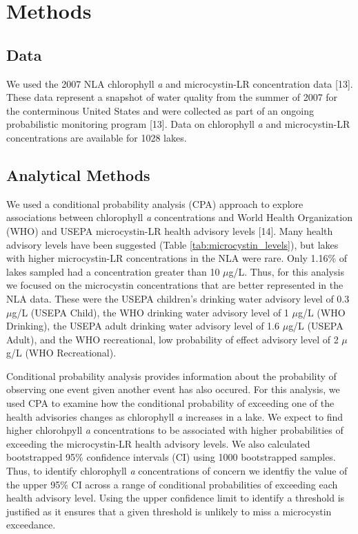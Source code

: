 \documentclass[11pt,]{article}
\begin{document}
\section{Methods}\label{methods}

\subsection{Data}\label{data}

We used the 2007 NLA chlorophyll \emph{a} and microcystin-LR
concentration data {[}13{]}. These data represent a snapshot of water
quality from the summer of 2007 for the conterminous United States and
were collected as part of an ongoing probabilistic monitoring program
{[}13{]}. Data on chlorophyll \emph{a} and microcystin-LR concentrations
are available for 1028 lakes.

\subsection{Analytical Methods}\label{analytical-methods}

We used a conditional probability analysis (CPA) approach to explore
associations between chlorophyll \emph{a} concentrations and World
Health Organization (WHO) and USEPA microcystin-LR health advisory
levels {[}14{]}. Many health advisory levels have been suggested (Table
\ref{tab:microcystin_levels}), but lakes with higher microcystin-LR
concentrations in the NLA were rare. Only 1.16\% of lakes sampled had a
concentration greater than 10 \(\mu\)g/L. Thus, for this analysis we
focused on the microcystin concentrations that are better represented in
the NLA data. These were the USEPA children's drinking water advisory
level of 0.3 \(\mu\)g/L (USEPA Child), the WHO drinking water advisory
level of 1 \(\mu\)g/L (WHO Drinking), the USEPA adult drinking water
advisory level of 1.6 \(\mu\)g/L (USEPA Adult), and the WHO
recreational, low probability of effect advisory level of 2 \(\mu\)g/L
(WHO Recreational).

Conditional probability analysis provides information about the
probability of observing one event given another event has also occured.
For this analysis, we used CPA to examine how the conditional
probability of exceeding one of the health advisories changes as
chlorophyll \emph{a} increases in a lake. We expect to find higher
chlorohpyll \emph{a} concentrations to be associated with higher
probabilities of exceeding the microcystin-LR health advisory levels. We
also calculated bootstrapped 95\% confidence intervals (CI) using 1000
bootstrapped samples. Thus, to identify chlorophyll \emph{a}
concentrations of concern we identfiy the value of the upper 95\% CI
across a range of conditional probabilities of exceeding each health
advisory level. Using the upper confidence limit to identify a threshold
is justified as it ensures that a given threshold is unlikely to miss a
microcystin exceedance.
\end{document}

